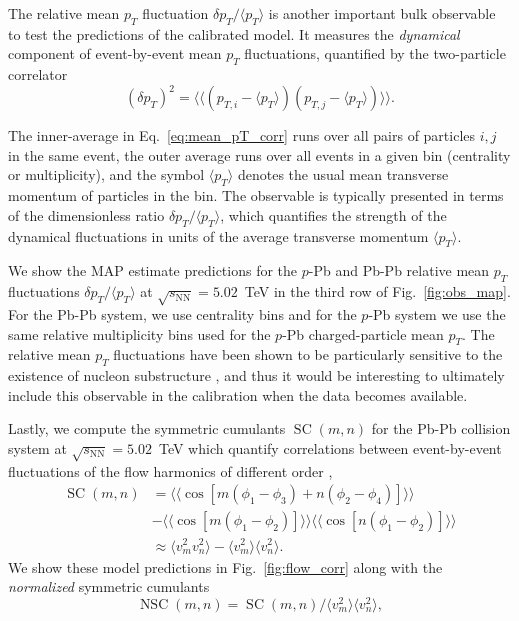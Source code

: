 \documentclass[aps,prc,reprint,amsmath,nofootinbib]{revtex4-1}
\newcommand{\sqrts}{\sqrt{s_\mathrm{NN}}}
\DeclareMathOperator{\SC}{SC}
\DeclareMathOperator{\NSC}{NSC}
\begin{document}
The relative mean $p_T$ fluctuation $\delta p_T / \langle p_T \rangle$ is another important bulk observable to test the predictions of the calibrated model.
It measures the \emph{dynamical} component of event-by-event mean $p_T$ fluctuations, quantified by the two-particle correlator
\begin{equation}
  \label{eq:mean_pT_corr}
  (\delta p_T)^2 = \langle \langle (p_{T,i} - \langle p_T \rangle) (p_{T,j} - \langle p_T \rangle) \rangle \rangle.
\end{equation}

\noindent The inner-average in Eq.~\eqref{eq:mean_pT_corr} runs over all pairs of particles $i,j$ in the same event, the outer average runs over all events in a given bin (centrality or multiplicity), and the symbol $\langle p_T \rangle$ denotes the usual mean transverse momentum of particles in the bin.
The observable is typically presented in terms of the dimensionless ratio $\delta p_T / \langle p_T \rangle$, which quantifies the strength of the dynamical fluctuations in units of the average transverse momentum $\langle p_T \rangle$.

We show the MAP estimate predictions for the $p$-Pb and Pb-Pb relative mean $p_T$ fluctuations $\delta p_T / \langle p_T \rangle$ at $\sqrts=5.02$~TeV in the third row of Fig.~\ref{fig:obs_map}.
For the Pb-Pb system, we use centrality bins and for the $p$-Pb system we use the same relative multiplicity bins used for the $p$-Pb charged-particle mean $p_T$.
The relative mean $p_T$ fluctuations have been shown to be particularly sensitive to the existence of nucleon substructure \cite{Bozek:2017elk}, and thus it would be interesting to ultimately include this observable in the calibration when the data becomes available.

Lastly, we compute the symmetric cumulants $\SC(m,n)$ for the Pb-Pb collision system at $\sqrts=5.02$~TeV which quantify correlations between event-by-event fluctuations of the flow harmonics of different order \cite{Bilandzic:2013kga, ALICE:2016kpq},
\begin{align}
  \SC(m, n) &= \langle\langle \cos[m(\phi_1 - \phi_3) + n(\phi_2-\phi_4)]\rangle\rangle \nonumber \\
  \nonumber &- \langle\langle\cos[m(\phi_1-\phi_2)]\rangle\rangle\langle\langle\cos[n(\phi_1-\phi_2)]\rangle\rangle \label{eq:scmn}\\
  &\approx \langle v_m^2 v_n^2 \rangle - \langle v_m^2\rangle\langle v_n^2\rangle.
\end{align}
We show these model predictions in Fig.~\ref{fig:flow_corr} along with the \emph{normalized} symmetric cumulants
\begin{equation}
  \NSC(m,n) = \SC(m,n)/\langle v_m^2\rangle\langle v_n^2\rangle,
\end{equation}
\end{document}
